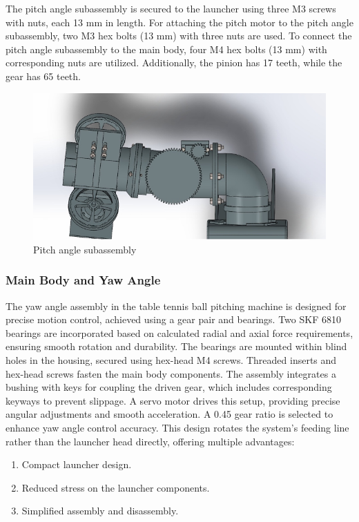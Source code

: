 \documentclass[12pt]{report}
\begin{document}
The pitch angle subassembly is secured to the launcher using three M3 screws with nuts, each 13 mm in length. For attaching the pitch motor to the pitch angle subassembly, two M3 hex bolts (13 mm) with three nuts are used. To connect the pitch angle subassembly to the main body, four M4 hex bolts (13 mm) with corresponding nuts are utilized. Additionally, the pinion has 17 teeth, while the gear has 65 teeth.

\begin{figure}[h!]
    \centering
    \includegraphics[width=0.7\linewidth]{2.3.2.png}
    \caption{Pitch angle subassembly}
    \label{fig:enter-label}
\end{figure}


\subsubsection{Main Body and Yaw Angle}

The yaw angle assembly in the table tennis ball pitching machine is designed for precise motion control, achieved using a gear pair and bearings. Two SKF 6810 bearings are incorporated based on calculated radial and axial force requirements, ensuring smooth rotation and durability. The bearings are mounted within blind holes in the housing, secured using hex-head M4 screws. Threaded inserts and hex-head screws fasten the main body components.
The assembly integrates a bushing with keys for coupling the driven gear, which includes corresponding keyways to prevent slippage. A servo motor drives this setup, providing precise angular adjustments and smooth acceleration. A 0.45 gear ratio is selected to enhance yaw angle control accuracy.
This design rotates the system's feeding line rather than the launcher head directly, offering multiple advantages:

\begin{enumerate}
    \item Compact launcher design.
    \item Reduced stress on the launcher components.
    \item Simplified assembly and disassembly.
\end{enumerate}
\end{document}
